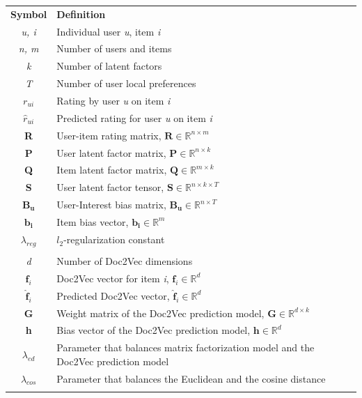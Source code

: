 \begin{table}[p]
	\begin{center}
		\begin{tabularx}{\linewidth}{cX}
			\hline \hline \textbf{Symbol} & \textbf{Definition} \\
			\textit{u, i} & Individual user \textit{u}, item \textit{i} \\
			\textit{n, m} & Number of users and items \\
			\textit{k} & Number of latent factors \\
			\textit{T} & Number of user local preferences \\
			$\mathit{r_{ui}}$ & Rating by user \textit{u} on item \textit{i}\\
			$\mathit{\hat{r}_{ui}}$ & Predicted rating for user \textit{u} on item \textit{i} \\
			\textbf{R} & User-item rating matrix, $\mathbf{R} \in \mathds{R}^{n \times m}$ \\
			\textbf{P} & User latent factor matrix, $\mathbf{P} \in \mathds{R}^{n \times k}$ \\
			\textbf{Q} & Item latent factor matrix, $\mathbf{Q} \in \mathds{R}^{m \times k}$ \\
			\textbf{S} & User latent factor tensor, $\mathbf{S} \in \mathds{R}^{n \times k \times T}$ \\
			$\mathbf{B_u}$ & User-Interest bias matrix, $\mathbf{B_u} \in \mathds{R}^{n \times T}$ \\
			$\mathbf{b_i}$ & Item bias vector, $\mathbf{b_i} \in \mathds{R}^{m}$ \\ 
			$\lambda_{reg}$ & $l_2$-regularization constant\\
			\\
			
			\textit{d} & Number of Doc2Vec dimensions \\
			$\mathbf{f}_i$ & Doc2Vec vector for item \textit{i}, $\mathbf{f}_i \in \mathds{R}^{d}$ \\
			$\mathbf{\hat{f}}_i$ & Predicted Doc2Vec vector, $\mathbf{\hat{f}}_i \in \mathds{R}^{d}$\\
			\textbf{G} & Weight matrix of the Doc2Vec prediction model, $\mathbf{G} \in \mathds{R}^{d \times k}$ \\
			\textbf{h} & Bias vector of the Doc2Vec prediction model, $\mathbf{h} \in \mathds{R}^{d}$ \\
			$\lambda_{ed}$ & Parameter that balances matrix factorization model and the Doc2Vec prediction model \\
			$\lambda_{cos}$ & Parameter that balances the Euclidean and the cosine distance \\
			\\
			

\end{tabularx}
\end{center}
\end{table}
